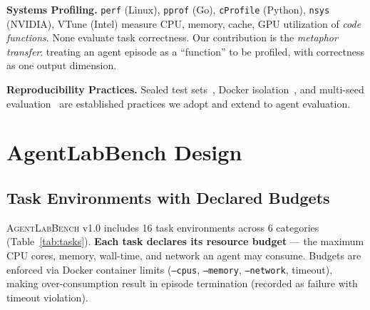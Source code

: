 \documentclass[letterpaper, 10 pt, conference]{ieeeconf}
\newcommand{\agentslabench}{\textsc{AgentLabBench}}
\begin{document}
\textbf{Systems Profiling.} \texttt{perf} (Linux), \texttt{pprof} (Go), \texttt{cProfile} (Python), \texttt{nsys} (NVIDIA), VTune (Intel) measure CPU, memory, cache, GPU utilization of \textit{code functions}. None evaluate task correctness. Our contribution is the \textit{metaphor transfer}: treating an agent episode as a ``function'' to be profiled, with correctness as one output dimension.

\textbf{Reproducibility Practices.} Sealed test sets~\cite{rajpurkar2016squad}, Docker isolation~\cite{merkel2014docker}, and multi-seed evaluation~\cite{henderson2018deep} are established practices we adopt and extend to agent evaluation.

\section{AgentLabBench Design}
\label{sec:design}

\subsection{Task Environments with Declared Budgets}
\label{sec:tasks}

\agentslabench{} v1.0 includes 16 task environments across 6 categories (Table~\ref{tab:tasks}). \textbf{Each task declares its resource budget} --- the maximum CPU cores, memory, wall-time, and network an agent may consume. Budgets are enforced via Docker container limits (\texttt{--cpus}, \texttt{--memory}, \texttt{--network}, timeout), making over-consumption result in episode termination (recorded as failure with timeout violation).
\end{document}
